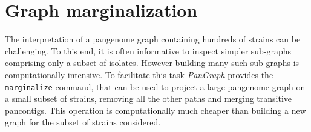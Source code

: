 \documentclass[aps,rmp,preprint,superscriptaddress,10pt,linenumbers]{revtex4-1}
\begin{document}
\section{Graph marginalization}

The interpretation of a pangenome graph containing hundreds of strains can be challenging. To this end, it is often informative to inspect simpler sub-graphs comprising only a subset of isolates. However building many such sub-graphs is computationally intensive. To facilitate this task \textit{PanGraph} provides the \verb|marginalize| command, that can be used to project a large pangenome graph on a small subset of strains, removing all the other paths and merging transitive pancontigs. This operation is computationally much cheaper than building a new graph for the subset of strains considered.
\end{document}
